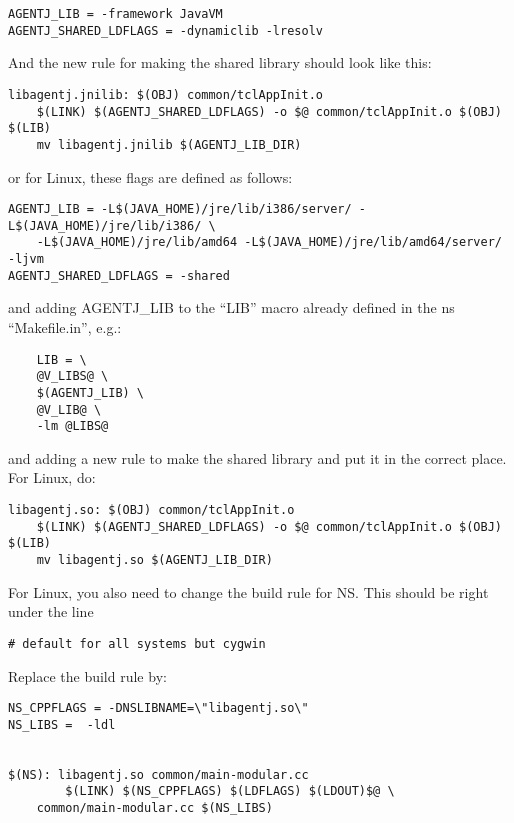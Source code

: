 \footnotesize
\begin{verbatim}
AGENTJ_LIB = -framework JavaVM
AGENTJ_SHARED_LDFLAGS = -dynamiclib -lresolv
\end{verbatim}
\normalsize

\noindent And the new rule for making the shared library should look like this:


\footnotesize
\begin{verbatim}
libagentj.jnilib: $(OBJ) common/tclAppInit.o
	$(LINK) $(AGENTJ_SHARED_LDFLAGS) -o $@ common/tclAppInit.o $(OBJ) $(LIB)
	mv libagentj.jnilib $(AGENTJ_LIB_DIR)    
\end{verbatim}
\normalsize


\noindent or for Linux, these flags are defined as follows:


\footnotesize
\begin{verbatim}
AGENTJ_LIB = -L$(JAVA_HOME)/jre/lib/i386/server/ -L$(JAVA_HOME)/jre/lib/i386/ \
	-L$(JAVA_HOME)/jre/lib/amd64 -L$(JAVA_HOME)/jre/lib/amd64/server/ -ljvm
AGENTJ_SHARED_LDFLAGS = -shared
\end{verbatim}
\normalsize


\noindent and adding AGENTJ\_LIB to the ``LIB'' macro already defined in the ns ``Makefile.in'', e.g.:
    
\footnotesize
\begin{verbatim}
    LIB	= \
	@V_LIBS@ \
	$(AGENTJ_LIB) \
	@V_LIB@ \
	-lm @LIBS@
\end{verbatim}
\normalsize

\noindent  and adding a new rule to make the shared library and put it in the correct place. For Linux, do:

\footnotesize
\begin{verbatim}
libagentj.so: $(OBJ) common/tclAppInit.o
	$(LINK) $(AGENTJ_SHARED_LDFLAGS) -o $@ common/tclAppInit.o $(OBJ) $(LIB)
	mv libagentj.so $(AGENTJ_LIB_DIR)
\end{verbatim}
\normalsize

\noindent For Linux, you also need to change the build rule for NS. This should be right under the line
\begin{verbatim}
# default for all systems but cygwin
\end{verbatim}
\noindent Replace the build rule by:

\begin{verbatim}
NS_CPPFLAGS = -DNSLIBNAME=\"libagentj.so\"
NS_LIBS =  -ldl


$(NS): libagentj.so common/main-modular.cc
        $(LINK) $(NS_CPPFLAGS) $(LDFLAGS) $(LDOUT)$@ \
	common/main-modular.cc $(NS_LIBS)

\end{verbatim}


